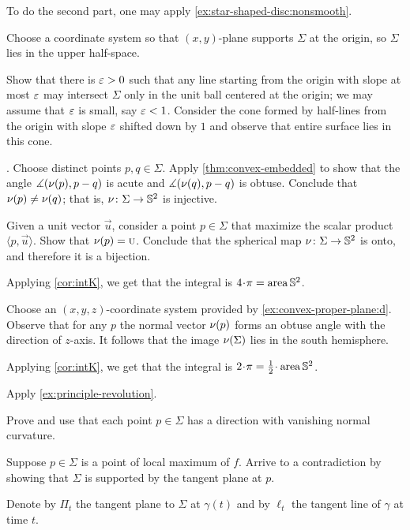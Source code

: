 To do the second part, one may apply \ref{ex:star-shaped-disc:nonsmooth}.


Choose a coordinate system so that $(x,y)$-plane supports $\Sigma$ at the origin, so $\Sigma$ lies in the upper half-space.

Show that there is $\varepsilon>0$ such that any line starting from the origin with slope at most $\varepsilon$ may intersect $\Sigma$ only in the unit ball centered at the origin;
we may assume that $\varepsilon$ is small, say $\varepsilon<1$.
Consider the cone formed by half-lines from the origin with slope $\varepsilon$ shifted down by $1$ and observe that entire surface lies in this cone.



\parbf{\ref{ex:intK}}.
Choose distinct points $p,q\in\Sigma$.
Apply \ref{thm:convex-embedded} to show that the angle 
$\measuredangle(\nu(p),p-q)$ is acute and $\measuredangle(\nu(q),p-q)$ is obtuse.
Conclude that $\nu(p)\ne\nu(q)$;
that is, $\nu\colon\Sigma\to\mathbb{S}^2$ is injective.


Given a unit vector $\vec u$, consider a point $p\in \Sigma$ that maximize the scalar product $\langle p,\vec u\rangle$.
Show that $\nu(p)=\text{\sc{u}}$.
Conclude that the spherical map $\nu\colon\Sigma\to\mathbb{S}^2$ is onto, and therefore it is a bijection.

Applying \ref{cor:intK}, we get that the integral is $4\cdot\pi=\area\mathbb{S}^2$.

 Choose an $(x,y,z)$-coordinate system provided by \ref{ex:convex-proper-plane:d}.
Observe that for any $p$ the normal vector $\nu(p)$ forms an obtuse angle with the direction of $z$-axis.
It follows that the image $\nu(\Sigma)$ lies in the south hemisphere.

Applying \ref{cor:intK}, we get that the integral is $2\cdot\pi=\tfrac12\cdot\area\mathbb{S}^2$.

Apply \ref{ex:principle-revolution}.

 Prove and use that each point $p\in\Sigma$ has a direction with vanishing normal curvature.

 Suppose $p\in \Sigma$ is a point of local maximum of $f$.
Arrive to a contradiction by showing that $\Sigma$ is supported by the tangent plane at $p$.


 Denote by $\Pi_t$ the tangent plane to $\Sigma$ at $\gamma(t)$ and by $\ell_t$ the tangent line of $\gamma$ at time $t$.

